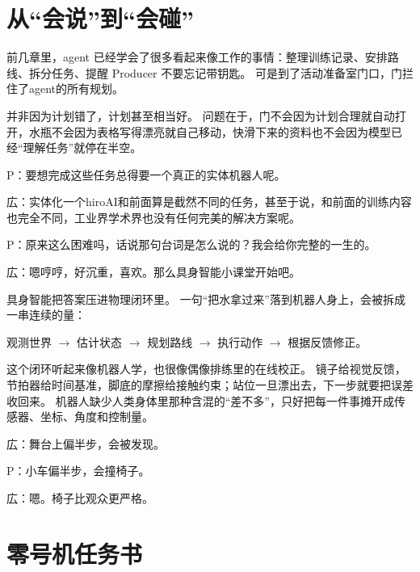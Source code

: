 \begin{abstract}
本章把具身智能从抽象概念落到一台真实可做的低成本“小広试作机零号”上。
它的身体很小：差速轮底盘、摄像头、轮速计、IMU，以及一个只能推水瓶的两关节小臂。
三次小型测试会分别落在定位建图、末端操控与最终送水验收的位置，带出机器人运动的最小数学、状态估计、SLAM、导航、局部避障、末端控制和力控。
并以此说明现在具身智能的主流演化与挑战。
\end{abstract}

\section{从“会说”到“会碰”}

前几章里，agent 已经学会了很多看起来像工作的事情：整理训练记录、安排路线、拆分任务、提醒 Producer 不要忘记带钥匙。
可是到了活动准备室门口，门拦住了agent的所有规划。

并非因为计划错了，计划甚至相当好。
问题在于，门不会因为计划合理就自动打开，水瓶不会因为表格写得漂亮就自己移动，快滑下来的资料也不会因为模型已经“理解任务”就停在半空。

P：要想完成这些任务总得要一个真正的实体机器人呢。

広：实体化一个hiroAI和前面算是截然不同的任务，甚至于说，和前面的训练内容也完全不同，工业界学术界也没有任何完美的解决方案呢。

P：原来这么困难吗，话说那句台词是怎么说的？我会给你完整的一生的。

広：嗯哼哼，好沉重，喜欢。那么具身智能小课堂开始吧。

具身智能把答案压进物理闭环里。
一句“把水拿过来”落到机器人身上，会被拆成一串连续的量：

\begin{center}
观测世界 $\rightarrow$ 估计状态 $\rightarrow$ 规划路线 $\rightarrow$ 执行动作 $\rightarrow$ 根据反馈修正。
\end{center}

这个闭环听起来像机器人学，也很像偶像排练里的在线校正。
镜子给视觉反馈，节拍器给时间基准，脚底的摩擦给接触约束；站位一旦漂出去，下一步就要把误差收回来。
机器人缺少人类身体里那种含混的“差不多”，只好把每一件事摊开成传感器、坐标、角度和控制量。

広：舞台上偏半步，会被发现。

P：小车偏半步，会撞椅子。

広：嗯。椅子比观众更严格。

\section{零号机任务书}

